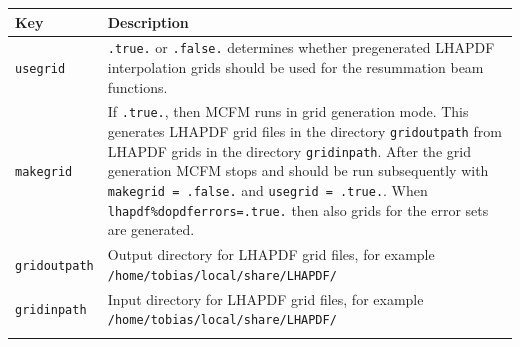 \begin{longtable}[]{@{}ll@{}}
	\begin{minipage}[b]{0.24\columnwidth}\raggedright
		Key\strut
	\end{minipage} & \begin{minipage}[b]{0.71\columnwidth}\raggedright
		Description\strut
	\end{minipage}\tabularnewline
	\endhead
	\begin{minipage}[t]{0.24\columnwidth}\raggedright
		\texttt{usegrid}\strut
	\end{minipage} & \begin{minipage}[t]{0.71\columnwidth}\raggedright
		\texttt{.true.} or \texttt{.false.} determines whether pregenerated
		LHAPDF interpolation grids should be used for the resummation beam
		functions.\strut
	\end{minipage}\tabularnewline
	\begin{minipage}[t]{0.24\columnwidth}\raggedright
		\texttt{makegrid}\strut
	\end{minipage} & \begin{minipage}[t]{0.71\columnwidth}\raggedright
		If \texttt{.true.}, then MCFM runs in grid generation mode. This
		generates LHAPDF grid files in the directory \texttt{gridoutpath} from
		LHAPDF grids in the directory \texttt{gridinpath}. After the grid
		generation MCFM stops and should be run subsequently with
		\texttt{makegrid = .false.} and \texttt{usegrid = .true.}. When
		\texttt{lhapdf\%dopdferrors=.true.} then also grids for the error sets
		are generated.\strut
	\end{minipage}\tabularnewline
	\begin{minipage}[t]{0.24\columnwidth}\raggedright
		\texttt{gridoutpath}\strut
	\end{minipage} & \begin{minipage}[t]{0.71\columnwidth}\raggedright
		Output directory for LHAPDF grid files, for example
		\texttt{/home/tobias/local/share/LHAPDF/}\strut
	\end{minipage}\tabularnewline
	\begin{minipage}[t]{0.24\columnwidth}\raggedright
		\texttt{gridinpath}\strut
	\end{minipage} & \begin{minipage}[t]{0.71\columnwidth}\raggedright
		Input directory for LHAPDF grid files, for example
		\texttt{/home/tobias/local/share/LHAPDF/}\strut
	\end{minipage}\tabularnewline
	\begin{minipage}[t]{0.24\columnwidth}\raggedright

\end{minipage}
\end{longtable}

